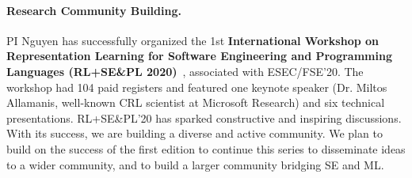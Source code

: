 \paragraph{Research Community Building.}

PI Nguyen has successfully organized the 1st {\bf International
Workshop on Representation Learning for Software Engineering and
Programming Languages (RL+SE\&PL 2020)}~\cite{rlsepl}, associated with
ESEC/FSE'20. The workshop had 104 paid registers and featured one
keynote speaker (Dr. Miltos Allamanis, well-known CRL scientist at
Microsoft Research) and six technical presentations. RL+SE\&PL'20 has
sparked constructive and inspiring discussions. With its success, we
are building a diverse and active community. We plan to build on the
success of the first edition to continue this series to disseminate
ideas to a wider community, and to build a larger community bridging
SE and ML.
